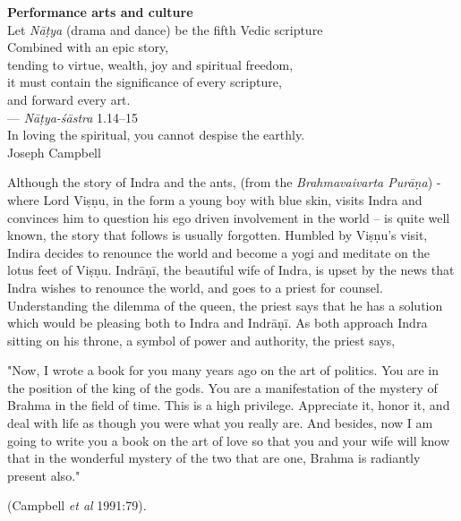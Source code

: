 \begin{flushright}
{\bf Performance arts and culture}\\[2pt]
Let \textsl{Nāṭya} (drama and dance) be the fifth Vedic scripture\\[2pt]
Combined with an epic story,\\[2pt]
tending to virtue, wealth, joy and spiritual freedom,\\[2pt]
it must contain the significance of every scripture,\\[2pt]
and forward every art.\\[2pt]
--- \textsl{Nāṭya-śāstra} 1.14--15\\[2pt]
In loving the spiritual, you cannot despise the earthly.\\[2pt]
Joseph Campbell
\end{flushright}

\medskip

Although the story of Indra and the ants, (from the \textsl{Brahmavaivarta Purāṇa}) - where Lord Viṣṇu, in the form a young boy with blue skin, visits Indra and convinces him to question his ego driven involvement in the world -- is quite well known, the story that follows is usually forgotten. Humbled by Viṣṇu's visit, Indira decides to renounce the world and become a yogi and meditate on the lotus feet of Viṣṇu. Indrāṇī, the beautiful wife of Indra, is upset by the news that Indra wishes to renounce the world, and goes to a priest for counsel. Understanding the dilemma of the queen, the priest says that he has a solution which would be pleasing both to Indra and Indrāṇī. As both approach Indra sitting on his throne, a symbol of power and authority, the priest says, 

\begin{myquote}
"Now, I wrote a book for you many years ago on the art of politics. You are in the position of the king of the gods. You are a manifestation of the mystery of Brahma in the field of time. This is a high privilege. Appreciate it, honor it, and deal with life as though you were what you really are. And besides, now I am going to write you a book on the art of love so that you and your wife will know that in the wonderful mystery of the two that are one, Brahma is radiantly present also." 

\hfill (Campbell \textsl{et al} 1991:79).
\end{myquote}

